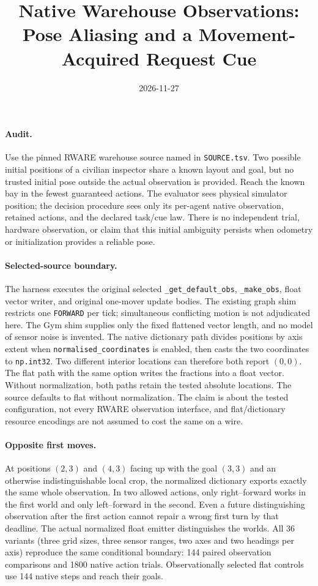 \documentclass[11pt]{article}
\title{Native Warehouse Observations: Pose Aliasing and a Movement-Acquired Request Cue}
\date{2026-11-27}
\begin{document}
\maketitle

\paragraph{Audit.}
Use the pinned RWARE warehouse source named in \texttt{SOURCE.tsv}.
Two possible initial positions of a civilian inspector share a
known layout and goal, but no trusted initial pose outside the
actual observation is provided. Reach the known bay in the
fewest guaranteed actions. The evaluator sees physical simulator
position; the decision procedure sees only its per-agent native
observation, retained actions, and the declared task/cue law.
There is no independent trial, hardware observation, or claim that
this initial ambiguity persists when odometry or initialization
provides a reliable pose.

\paragraph{Selected-source boundary.}
The harness executes the original selected
\texttt{\_get\_default\_obs}, \texttt{\_make\_obs}, float vector writer,
and original one-mover update bodies. The existing graph shim restricts
one \texttt{FORWARD} per tick; simultaneous conflicting motion is
not adjudicated here. The Gym shim supplies only the fixed flattened
vector length, and no model of sensor noise is invented.
The native dictionary path divides positions by axis extent when
\texttt{normalised\_coordinates} is enabled, then
casts the two coordinates to \texttt{np.int32}.
Two different interior locations can therefore both report \((0,0)\).
The flat path with the same option writes the fractions into a
float vector. Without normalization, both paths retain the tested
absolute locations. The source defaults to flat without normalization.
The claim is about the tested configuration, not every RWARE
observation interface, and flat/dictionary resource encodings
are not assumed to cost the same on a wire.

\paragraph{Opposite first moves.}
At positions \((2,3)\) and \((4,3)\) facing up with the goal
\((3,3)\) and an otherwise indistinguishable local crop,
the normalized dictionary exports exactly the same whole
observation. In two allowed actions, only right--forward
works in the first world and only left--forward in the second.
Even a future distinguishing observation after the first
action cannot repair a wrong first turn by that deadline.
The actual normalized float emitter distinguishes the worlds.
All 36 variants (three grid sizes, three sensor ranges, two
axes and two headings per axis) reproduce the same conditional
boundary: 144 paired observation comparisons and 1800
native action trials. Observationally selected flat controls
use 144 native steps and reach their goals.
\end{document}
